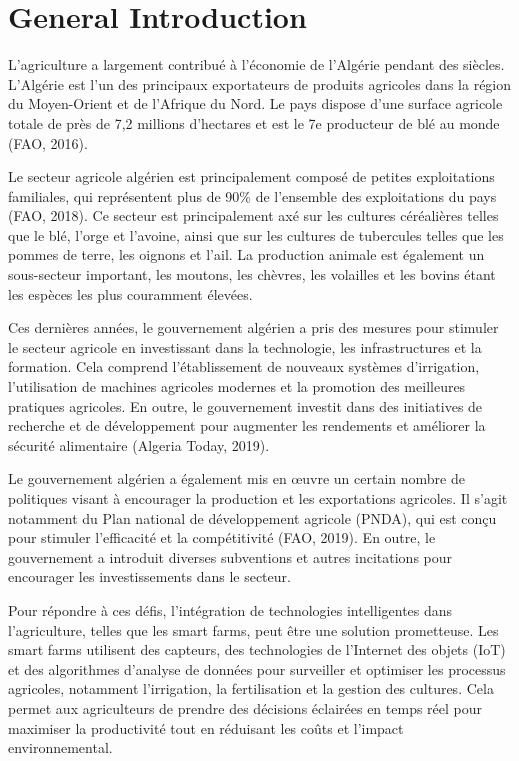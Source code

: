 \chapter*{General Introduction} 
\label{chap:introduction} 

L'agriculture a largement contribué à l'économie de l'Algérie pendant des siècles. L'Algérie est l'un des principaux exportateurs de produits agricoles dans la région du Moyen-Orient et de l'Afrique du Nord. Le pays dispose d'une surface agricole totale de près de 7,2 millions d'hectares et est le 7e producteur de blé au monde (FAO, 2016).

Le secteur agricole algérien est principalement composé de petites exploitations familiales, qui représentent plus de 90\% de l'ensemble des exploitations du pays (FAO, 2018). Ce secteur est principalement axé sur les cultures céréalières telles que le blé, l'orge et l'avoine, ainsi que sur les cultures de tubercules telles que les pommes de terre, les oignons et l'ail. La production animale est également un sous-secteur important, les moutons, les chèvres, les volailles et les bovins étant les espèces les plus couramment élevées.

Ces dernières années, le gouvernement algérien a pris des mesures pour stimuler le secteur agricole en investissant dans la technologie, les infrastructures et la formation. Cela comprend l'établissement de nouveaux systèmes d'irrigation, l'utilisation de machines agricoles modernes et la promotion des meilleures pratiques agricoles. En outre, le gouvernement investit dans des initiatives de recherche et de développement pour augmenter les rendements et améliorer la sécurité alimentaire (Algeria Today, 2019).

Le gouvernement algérien a également mis en œuvre un certain nombre de politiques visant à encourager la production et les exportations agricoles. Il s'agit notamment du Plan national de développement agricole (PNDA), qui est conçu pour stimuler l'efficacité et la compétitivité (FAO, 2019). En outre, le gouvernement a introduit diverses subventions et autres incitations pour encourager les investissements dans le secteur.


Pour répondre à ces défis, l'intégration de technologies intelligentes dans l'agriculture, telles que les smart farms, peut être une solution prometteuse. Les smart farms utilisent des capteurs, des technologies de l'Internet des objets (IoT) et des algorithmes d'analyse de données pour surveiller et optimiser les processus agricoles, notamment l'irrigation, la fertilisation et la gestion des cultures. Cela permet aux agriculteurs de prendre des décisions éclairées en temps réel pour maximiser la productivité tout en réduisant les coûts et l'impact environnemental.



